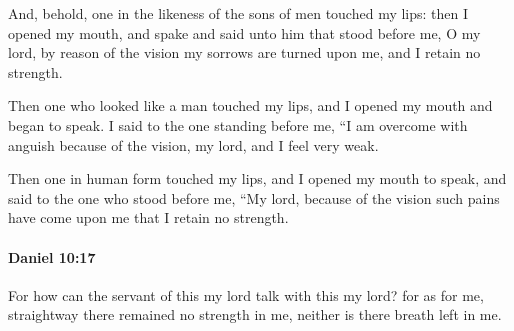 			\begin{versebox}
					\item[BHS] 
					\item[LXX] 
					\item[ASV] And, behold, one in the likeness of the sons of men touched my lips: then I opened my mouth, and spake and said unto him that stood before me, O my lord, by reason of the vision my sorrows are turned upon me, and I retain no strength.
					\item[NIV] Then one who looked like a man touched my lips, and I opened my mouth and began to speak. I said to the one standing before me, “I am overcome with anguish because of the vision, my lord, and I feel very weak.
					\item[NRSV] Then one in human form touched my lips, and I opened my mouth to speak, and said to the one who stood before me, “My lord, because of the vision such pains have come upon me that I retain no strength.
			\end{versebox}

		\paragraph{Daniel 10:17} %
			\label{DANIEL-10-17}

			For how can the servant of this my lord talk with this my lord? for as for me, straightway there remained no strength in me, neither is there breath left in me.

